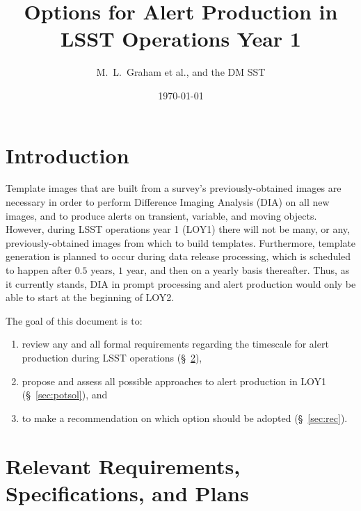 \documentclass[DM,lsstdraft,toc]{lsstdoc}
\title[Alert Production in Year 1]{Options for Alert Production in \\ LSST Operations Year 1}
\author{M.~L.~Graham et al., and the DM SST}
\date{\today}
\begin{document}
\maketitle


\section{Introduction} \label{sec:intro}

Template images that are built from a survey's previously-obtained images are necessary in order to perform Difference Imaging Analysis (DIA) on all new images, and to produce alerts on transient, variable, and moving objects. However, during LSST operations year 1 (LOY1) there will not be many, or any, previously-obtained images from which to build templates. Furthermore, template generation is planned to occur during data release processing, which is scheduled to happen after $0.5$ years, $1$ year, and then on a yearly basis thereafter. Thus, as it currently stands, DIA in prompt processing and alert production would only be able to start at the beginning of LOY2. 

The goal of this document is to:
\begin{enumerate}
\item review any and all formal requirements regarding the timescale for alert production during LSST operations (\S~\ref{sec:req}), 
\item propose and assess all possible approaches to alert production in LOY1 (\S~\ref{sec:potsol}), and 
\item to make a recommendation on which option should be adopted (\S~\ref{sec:rec}).
\end{enumerate}


\section{Relevant Requirements, Specifications, and Plans}\label{sec:req}
\end{document}
